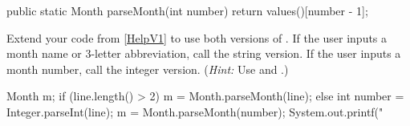 \begin{answer}[6em]
\begin{javaans}
public static Month parseMonth(int number) {
    return values()[number - 1];
}
\end{javaans}
\end{answer}


\Q \label{key4}
Extend your code from \ref{HelpV1} to use both versions of .
If the user inputs a month name or 3-letter abbreviation, call the string version.
If the user inputs a month number, call the integer version.
(\textit{Hint:} Use  and .)

\begin{answer}[12em]
\begin{javaans}
Month m;
if (line.length() > 2) {
    m = Month.parseMonth(line);
} else {
    int number = Integer.parseInt(line);
    m = Month.parseMonth(number);
}
System.out.printf("%
\end{javaans}
\end{answer}

